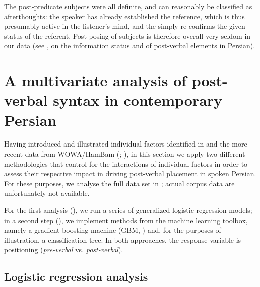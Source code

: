 \documentclass[output=paper,colorlinks,citecolor=brown,draftmode]{langscibook}
\begin{document}
The post-predicate subjects were all definite, and can reasonably be classified as afterthoughts: the speaker has already established the reference, which is thus presumably active in the listener's mind, and the  simply re-confirms the given status of the referent. Post-posing of subjects is therefore overall very seldom in our data (see , on the information status and  of post-verbal elements in Persian).

\section{A multivariate analysis of post-verbal syntax in contemporary Persian}\label{Persian:4}

Having introduced and illustrated individual factors identified in \citet{frommer_post-verbal_1981} and the more recent data from WOWA/HamBam (\citealt{Izadi2022Persian}; \citealt{HaigRasekhMahand2022HamBam}), in this section we apply two different methodologies that control for the interactions of individual factors in order to assess their respective impact in driving post-verbal placement in spoken Persian. For these purposes, we analyse the full data set in \citet{Izadi2022Persian};  actual corpus data are unfortunately not available. 

For the first analysis (), we run a series of generalized logistic regression models; in a second step (), we implement methods from the machine learning toolbox, namely a gradient boosting machine (GBM, \citealt{Friedman2001Greedy}) and, for the purposes of illustration, a classification tree. In both approaches, the response variable is positioning (\textit{pre-verbal} vs. \textit{post-verbal}).


\subsection{Logistic regression analysis}\label{Persian:4.1}
\end{document}
